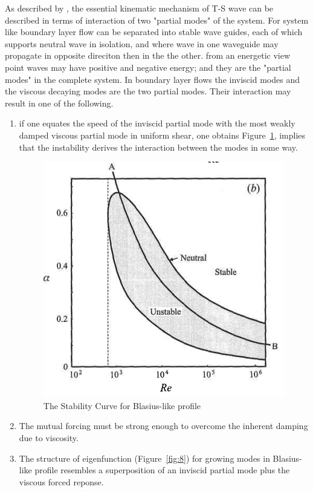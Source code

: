 \documentclass[twoside]{iitbreport}
\newcommand{\Figref}[1]{Figure~\ref{fig:#1}}
\begin{document}
As described by \citet{Majumdar1996}, the essential kinematic mechanism of
T-S wave can be described in terms of interaction of two "partial modes"
of the system. For system like boundary layer flow can be separated
into stable wave guides, each of which supports neutral wave in isolation,
and where wave in one waveguide may propagate in opposite direciton then in
the the other. from an energetic view point waves may have positive and negative
energy; and they are the "partial modes" in the complete system. In
boundary layer flows the inviscid modes and the viscous decaying modes are
the two partial modes. Their interaction may result in one of the following.
\begin{enumerate}
  \item if one equates the speed of the inviscid partial mode with the most
    weakly damped viscous partial mode in uniform shear, one obtains
    \Figref{6}, implies that the instability derives the interaction between the
    modes in some way.
    \begin{figure}[h!]
      \centering
      \includegraphics{6.png}
      \caption{The Stability Curve for Blasius-like profile}
      \label{fig:6}
    \end{figure}
  \item The mutual forcing must be strong enough to overcome the inherent
    damping due to viscosity.
  \item The structure of eigenfunction (\Figref{8}) for growing modes in Blasius-like
    profile resembles a superposition of an inviscid partial mode plus the
    viscous forced reponse.
    \begin{figure}[h!]

\end{figure}
\end{enumerate}
\end{document}

